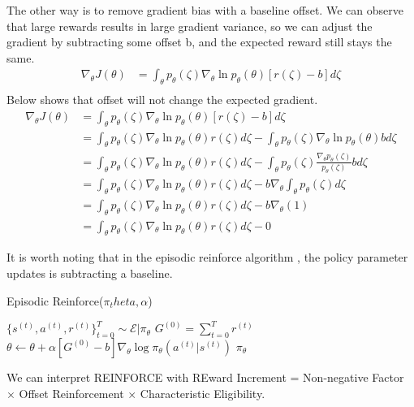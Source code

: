 \documentclass[11pt]{article}
\begin{document}
The other way is to remove gradient bias with a baseline offset. We can observe that large rewards results in large gradient variance, so we can adjust the gradient by subtracting some offset b, and the expected reward still stays the same.
\begin{align*}
    \nabla_\theta J(\theta) & = \int_\theta p_\theta(\zeta) \nabla_\theta \ln p_\theta(\theta)[r(\zeta)-b]d\zeta \\
\end{align*}
Below shows that offset will not change the expected gradient.
\begin{align*}
    \nabla_\theta J(\theta) & = \int_\theta p_\theta(\zeta) \nabla_\theta \ln p_\theta(\theta)[r(\zeta)-b]d\zeta \\
    & = \int_\theta p_\theta(\zeta) \nabla_\theta \ln p_\theta(\theta)r(\zeta)d\zeta - \int_\theta p_\theta(\zeta) \nabla_\theta \ln p_\theta(\theta)bd\zeta \\
    & = \int_\theta p_\theta(\zeta) \nabla_\theta \ln p_\theta(\theta)r(\zeta)d\zeta - \int_\theta p_\theta(\zeta) \frac{\nabla_\theta p_\theta(\zeta)}{p_\theta(\zeta)}bd\zeta \\
    & = \int_\theta p_\theta(\zeta) \nabla_\theta \ln p_\theta(\theta)r(\zeta)d\zeta - b\nabla_\theta \int_\theta p_\theta(\zeta) d\zeta \\
    & = \int_\theta p_\theta(\zeta) \nabla_\theta \ln p_\theta(\theta)r(\zeta)d\zeta - b\nabla_\theta(1) \\
    & = \int_\theta p_\theta(\zeta) \nabla_\theta \ln p_\theta(\theta)r(\zeta)d\zeta - 0
\end{align*}

It is worth noting that in the episodic reinforce algorithm \cite{williams1992simple}, the policy parameter updates is subtracting a baseline.
\begin{algorithm}[H]
\caption{Episodic Reinforce($\pi_theta, \alpha$)}
\begin{algorithmic}[1]
\STATE $\{s^{(t)}, a^{(t)}, r^{(t)}\}_{t=0}^T \sim \mathcal{E}|\pi_\theta$
\STATE $G^{(0)} = \sum_{t=0}^T r^{(t)}$ 
\STATE $\theta \leftarrow \theta + \alpha [G^{(0)}-b] \nabla_\theta \log \pi_\theta (a^{(t)}|s^{(t)}) $
\ENDFOR
\ENDFOR
\RETURN $\pi_\theta$
\end{algorithmic}
\end{algorithm}

We can interpret REINFORCE with REward Increment = Non-negative Factor $\times$ Offset Reinforcement $\times$ Characteristic Eligibility.
\end{document}
